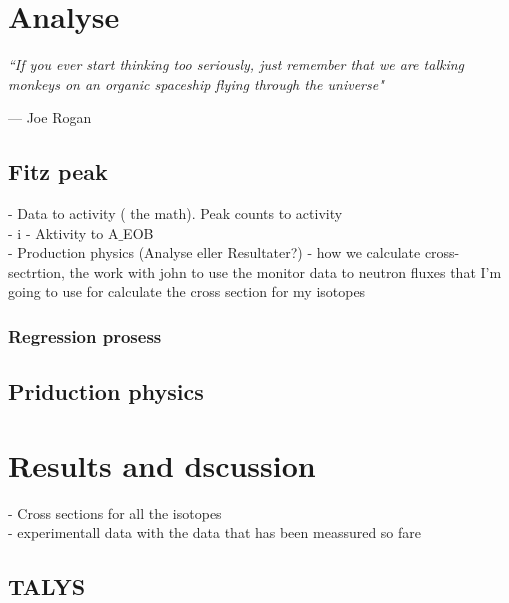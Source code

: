 \documentclass[twoside,english]{uiofysmaster/uiofysmaster}
\begin{document}
\chapter{Analyse}
\label{ch:analyse}

\epigraph{\itshape ``If you ever start thinking too seriously, just remember that we are talking monkeys on an organic spaceship flying through the universe"}{--- \textup{Joe Rogan}}



\section{Fitz peak}
\label{sec:fitz_peak}

- Data to activity ( the math). Peak counts to activity\\
- i - Aktivity to A$\_$EOB\\
- Production physics (Analyse eller Resultater?) - how we calculate cross-sectrtion, the work with john to use the monitor data to neutron fluxes that I’m going to use for calculate the cross section for my isotopes



\subsection{Regression prosess}


\section{Priduction physics}
\label{sec: prod_physics}




\chapter{Results and dscussion} 
\label{ch: res_and_discussion}
- Cross sections for all the isotopes\\
- experimentall data with the data that has been meassured so fare


\section{TALYS}
\label{sec: talys}
\end{document}
